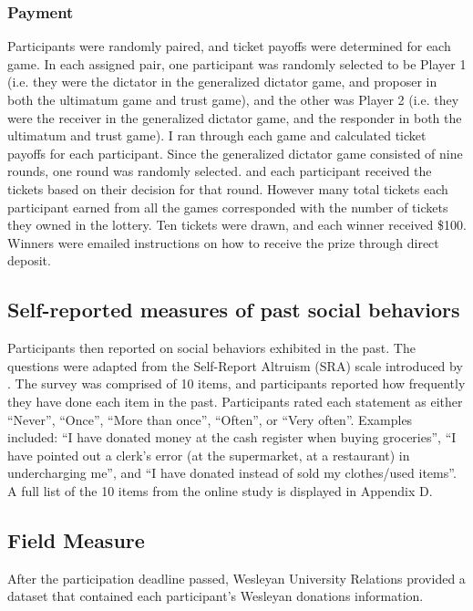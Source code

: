 \documentclass[12pt]{article}
\begin{document}
\subsubsection{Payment}

Participants were randomly paired, and ticket payoffs were determined for each game. In each assigned pair, one participant was randomly selected to be Player 1 (i.e. they were the dictator in the generalized dictator game, and proposer in both the ultimatum game and trust game), and the other was Player 2 (i.e. they were the receiver in the generalized dictator game, and the responder in both the ultimatum and trust game). I ran through each game and calculated ticket payoffs for each participant. Since the generalized dictator game consisted of nine rounds, one round was randomly selected. and each participant received the tickets based on their decision for that round. However many total tickets each participant earned from all the games corresponded with the number of tickets they owned in the lottery. Ten tickets were drawn, and each winner received \$100. Winners were emailed instructions on how to receive the prize through direct deposit.

\subsection{Self-reported measures of past social behaviors}

Participants then reported on social behaviors exhibited in the past. The questions were adapted from the Self-Report Altruism (SRA) scale introduced by \cite{rushton_chrisjohn_fekken_1981}. The survey was comprised of 10 items, and participants reported how frequently they have done each item in the past. Participants rated each statement as either ``Never'', ``Once'', ``More than once'', ``Often'', or ``Very often''. Examples included: ``I have donated money at the cash register when buying groceries'', ``I have pointed out a clerk\rq s error (at the supermarket, at a restaurant) in undercharging me'', and ``I have donated instead of sold my clothes/used items''. A full list of the 10 items from the online study is displayed in Appendix D. 

\subsection{Field Measure}

After the participation deadline passed, Wesleyan University Relations provided a dataset that contained each participant\rq s Wesleyan donations information.
\end{document}
